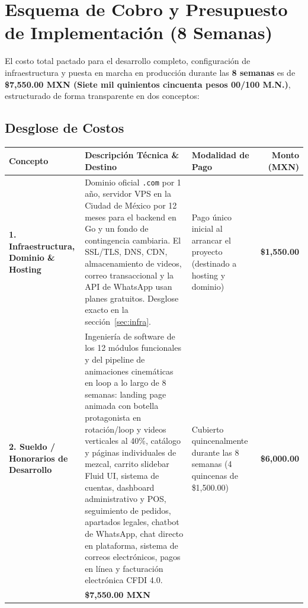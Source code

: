\documentclass[11pt,letterpaper]{article}
\begin{document}
\section{Esquema de Cobro y Presupuesto de Implementación (8 Semanas)}

El costo total pactado para el desarrollo completo, configuración de infraestructura y puesta en marcha en producción durante las \textbf{8 semanas} es de \textbf{\$7,550.00 MXN (Siete mil quinientos cincuenta pesos 00/100 M.N.)}, estructurado de forma transparente en dos conceptos:

\subsection{Desglose de Costos}

\begin{table}[H]
\centering
\small
\begin{tabularx}{\textwidth}{>{\raggedright\arraybackslash}p{3.6cm}>{\raggedright\arraybackslash}X>{\raggedright\arraybackslash}p{3.0cm}r}
\toprule
\rowcolor{MezcalAgave!15}
\textbf{Concepto} & \textbf{Descripción Técnica \& Destino} & \textbf{Modalidad de Pago} & \textbf{Monto (MXN)} \\
\midrule
\textbf{1. Infraestructura, Dominio \& Hosting} & 
Dominio oficial \texttt{.com} por 1 año, servidor VPS en la Ciudad de México por 12 meses para el backend en Go y un fondo de contingencia cambiaria. El SSL/TLS, DNS, CDN, almacenamiento de videos, correo transaccional y la API de WhatsApp usan planes gratuitos. Desglose exacto en la sección~\ref{sec:infra}. &
Pago único inicial al arrancar el proyecto (destinado a hosting y dominio) &
\textbf{\$1,550.00} \\
\midrule
\textbf{2. Sueldo / Honorarios de Desarrollo} & 
Ingeniería de software de los 12 módulos funcionales y del pipeline de animaciones cinemáticas en loop a lo largo de 8 semanas: landing page animada con botella protagonista en rotación/loop y videos verticales al 40\%, catálogo y páginas individuales de mezcal, carrito slidebar Fluid UI, sistema de cuentas, dashboard administrativo y POS, seguimiento de pedidos, apartados legales, chatbot de WhatsApp, chat directo en plataforma, sistema de correos electrónicos, pagos en línea y facturación electrónica CFDI 4.0. & 
Cubierto quincenalmente durante las 8 semanas (4 quincenas de \$1,500.00) &
\textbf{\$6,000.00} \\
\midrule
\rowcolor{MezcalGold!20}
\multicolumn{3}{l}{\textbf{TOTAL DEL PROYECTO LLAVE EN MANO (8 SEMANAS):}} & \textbf{\$7,550.00 MXN} \\
\bottomrule
\end{tabularx}
\end{table}
\end{document}
